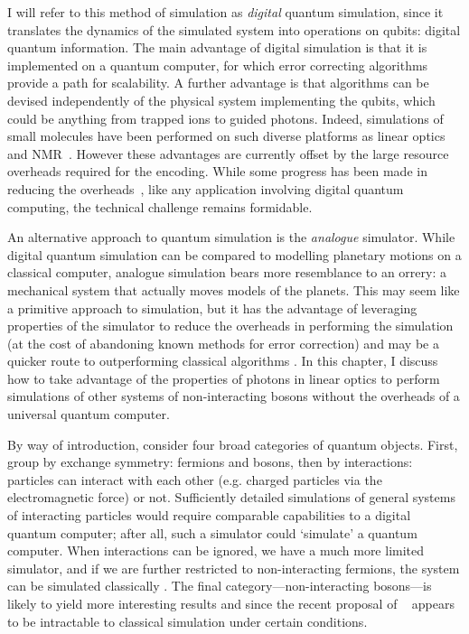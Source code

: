 I will refer to this method of simulation as \emph{digital} quantum simulation,
since it translates the dynamics of the simulated system into operations on
qubits: digital quantum information. The main advantage of digital simulation is
that it is implemented on a quantum computer, for which error correcting
algorithms provide a path for scalability. A further advantage is that
algorithms can be devised independently of the physical system implementing the
qubits, which could be anything from trapped ions to guided photons. Indeed,
simulations of small molecules have been performed on such diverse platforms as
linear optics~\cite{qsim-peruzzo} and NMR~\cite{qsim-du}. 
However these advantages are currently offset by the large resource overheads
required for the encoding. While some progress has been made in reducing the
overheads~\cite{qsim-poulin}, like any application involving digital quantum
computing, the technical challenge remains formidable.

An alternative approach to quantum simulation is the \emph{analogue} simulator.
While digital quantum simulation can be compared to modelling planetary motions
on a classical computer, analogue simulation bears more resemblance to an
orrery: a mechanical system that actually moves models of the planets. This may
seem like a primitive approach to simulation, but it has the advantage of
leveraging properties of the simulator to reduce the overheads in performing the
simulation (at the cost of abandoning known methods for error correction) and
may be a quicker route to outperforming classical algorithms
\cite{qsim-analogue}. In
this chapter, I discuss how to take advantage of the properties of photons in
linear optics to perform simulations of other systems of non-interacting bosons
without the overheads of a universal quantum computer.

By way of introduction, consider four broad categories of quantum objects.
First, group by exchange symmetry: fermions and bosons, then by interactions:
particles can interact with each other (e.g. charged particles via the
electromagnetic force) or not. Sufficiently detailed simulations of general
systems of interacting particles would require comparable capabilities to a
digital quantum computer; after all, such a simulator could `simulate' a quantum
computer. When
interactions can be ignored, we have a much more limited simulator, and if we
are further restricted to non-interacting fermions, the system can be simulated
classically . The final category---non-interacting
bosons---is likely to yield more interesting results and since the recent
proposal of \bosonsampling{}~\cite{bosonsampling} appears to be intractable to
classical simulation under certain conditions.

